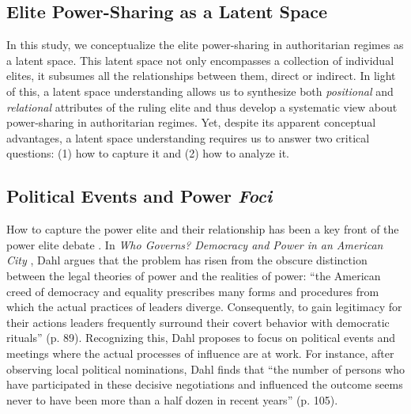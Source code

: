 \documentclass[11pt,english]{article}
\begin{document}
\begin{flushleft}
\section*{Elite Power-Sharing as a Latent Space}

In this study, we conceptualize the elite power-sharing in authoritarian regimes as a latent space. This latent space not only encompasses a collection of individual elites, it subsumes all the relationships between them, direct or indirect. In light of this, a latent space understanding allows us to synthesize both \emph{positional} and \emph{relational} attributes of the ruling elite and thus develop a systematic view about power-sharing in authoritarian regimes. Yet, despite its apparent conceptual advantages, a latent space understanding requires us to answer two critical questions: (1) how to capture it and (2) how to analyze it.

\subsection*{Political Events and Power \emph{Foci}}

How to capture the power elite and their relationship has been a key front of the power elite debate \citep{Domhoff2005}. In \emph{Who Governs? Democracy and Power in an American City} \citeyearpar{Dahl1961}, Dahl argues that the problem has risen from the obscure distinction between the legal theories of power and the realities of power: ``the American creed of democracy and equality prescribes many forms and procedures from which the actual practices of leaders diverge. Consequently, to gain legitimacy for their actions leaders frequently surround their covert behavior with democratic rituals'' (p. 89). Recognizing this, Dahl proposes to focus on political events and meetings where the actual processes of influence are at work. For instance, after observing local political nominations, Dahl finds that ``the number of persons who have participated in these decisive negotiations and influenced the outcome seems never to have been more than a half dozen in recent years'' (p. 105).


\end{flushleft}
\end{document}
